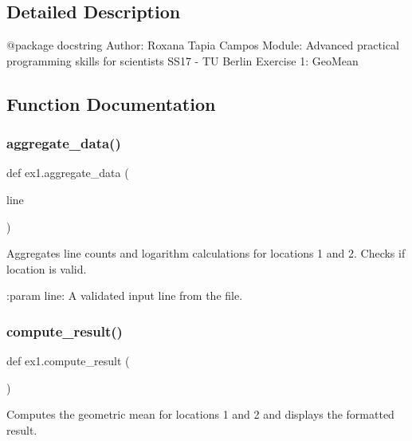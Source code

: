 \subsection{Detailed Description}
\begin{DoxyVerb}@package docstring
Author: Roxana Tapia Campos
Module: Advanced practical programming skills for scientists
SS17 - TU Berlin 
Exercise 1: GeoMean
\end{DoxyVerb}
 

\subsection{Function Documentation}
\mbox{\label{namespaceex1_aec8e1403e8459e0e3e246434aaf5e81c}} 
\subsubsection{\texorpdfstring{aggregate\+\_\+data()}{aggregate\_data()}}
{\footnotesize\ttfamily def ex1.\+aggregate\+\_\+data (\begin{DoxyParamCaption}\item[{}]{line }\end{DoxyParamCaption})}

\begin{DoxyVerb}Aggregates line counts and logarithm calculations for locations 1 and 2.
Checks if location is valid.

:param line: A validated input line from the file.
\end{DoxyVerb}
 \mbox{\label{namespaceex1_a5ecbebd2f233a7ee96f79960cb134a56}} 
\subsubsection{\texorpdfstring{compute\+\_\+result()}{compute\_result()}}
{\footnotesize\ttfamily def ex1.\+compute\+\_\+result (\begin{DoxyParamCaption}{ }\end{DoxyParamCaption})}

\begin{DoxyVerb}Computes the geometric mean for locations 1 and 2 and displays the formatted result. \end{DoxyVerb}
 \mbox{\label{namespaceex1_a7225290cae6386f5a1114cfffdd698b6}} 
